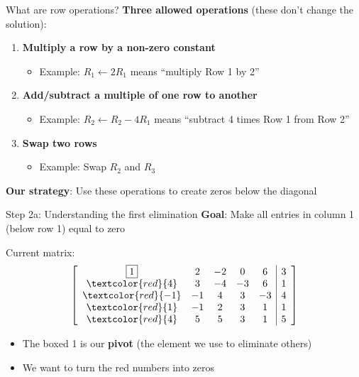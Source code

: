 \documentclass[aspectratio=169, lualatex, handout]{beamer}
\begin{document}
\begin{frame}{What are row operations?}
	\textbf{Three allowed operations} (these don't change the solution):
	\begin{enumerate}
		\item \textbf{Multiply a row by a non-zero constant}
		      \begin{itemize}
			      \item Example: $R_1 \leftarrow 2R_1$ means ``multiply Row 1 by 2''
		      \end{itemize}
		\item \textbf{Add/subtract a multiple of one row to another}
		      \begin{itemize}
			      \item Example: $R_2 \leftarrow R_2 - 4R_1$ means ``subtract 4 times Row 1 from Row 2''
		      \end{itemize}
		\item \textbf{Swap two rows}
		      \begin{itemize}
			      \item Example: Swap $R_2$ and $R_3$
		      \end{itemize}
	\end{enumerate}
	\textbf{Our strategy}: Use these operations to create zeros below the diagonal
\end{frame}

\begin{frame}{Step 2a: Understanding the first elimination}
	\textbf{Goal}: Make all entries in column 1 (below row 1) equal to zero

	Current matrix:
	\[
		\left[\begin{array}{ccccc|c}
				\boxed{1}           & 2  & -2 & 0  & 6  & 3 \\
				\textcolor{red}{4}  & 3  & -4 & -3 & 6  & 1 \\
				\textcolor{red}{-1} & -1 & 4  & 3  & -3 & 4 \\
				\textcolor{red}{1}  & -1 & 2  & 3  & 1  & 1 \\
				\textcolor{red}{4}  & 5  & 5  & 3  & 1  & 5
			\end{array}\right]
	\]

	\begin{itemize}
		\item The boxed 1 is our \textbf{pivot} (the element we use to eliminate others)
		\item We want to turn the red numbers into zeros
	\end{itemize}
\end{frame}
\end{document}
